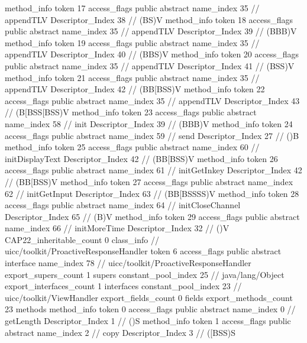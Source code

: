 {{{{{				}
				method_info {
					token	17
					access_flags	public abstract
					name_index	35		// appendTLV
					Descriptor_Index	38		// (BS)V
				}
				method_info {
					token	18
					access_flags	public abstract
					name_index	35		// appendTLV
					Descriptor_Index	39		// (BBB)V
				}
				method_info {
					token	19
					access_flags	public abstract
					name_index	35		// appendTLV
					Descriptor_Index	40		// (BBS)V
				}
				method_info {
					token	20
					access_flags	public abstract
					name_index	35		// appendTLV
					Descriptor_Index	41		// (BSS)V
				}
				method_info {
					token	21
					access_flags	public abstract
					name_index	35		// appendTLV
					Descriptor_Index	42		// (BB[BSS)V
				}
				method_info {
					token	22
					access_flags	public abstract
					name_index	35		// appendTLV
					Descriptor_Index	43		// (B[BSS[BSS)V
				}
				method_info {
					token	23
					access_flags	public abstract
					name_index	58		// init
					Descriptor_Index	39		// (BBB)V
				}
				method_info {
					token	24
					access_flags	public abstract
					name_index	59		// send
					Descriptor_Index	27		// ()B
				}
				method_info {
					token	25
					access_flags	public abstract
					name_index	60		// initDisplayText
					Descriptor_Index	42		// (BB[BSS)V
				}
				method_info {
					token	26
					access_flags	public abstract
					name_index	61		// initGetInkey
					Descriptor_Index	42		// (BB[BSS)V
				}
				method_info {
					token	27
					access_flags	public abstract
					name_index	62		// initGetInput
					Descriptor_Index	63		// (BB[BSSSS)V
				}
				method_info {
					token	28
					access_flags	public abstract
					name_index	64		// initCloseChannel
					Descriptor_Index	65		// (B)V
				}
				method_info {
					token	29
					access_flags	public abstract
					name_index	66		// initMoreTime
					Descriptor_Index	32		// ()V
				}
			}
			CAP22_inheritable_count	0
		}
		class_info {		// uicc/toolkit/ProactiveResponseHandler
			token	6
			access_flags	public abstract interface
			name_index	78		// uicc/toolkit/ProactiveResponseHandler
			export_supers_count	1
			supers {
				constant_pool_index	25		// java/lang/Object
			}
			export_interfaces_count	1
			interfaces {
				constant_pool_index	23		// uicc/toolkit/ViewHandler
			}
			export_fields_count	0
			fields {
			}
			export_methods_count	23
			methods {
				method_info {
					token	0
					access_flags	public abstract
					name_index	0		// getLength
					Descriptor_Index	1		// ()S
				}
				method_info {
					token	1
					access_flags	public abstract
					name_index	2		// copy
					Descriptor_Index	3		// ([BSS)S
}}}}}
